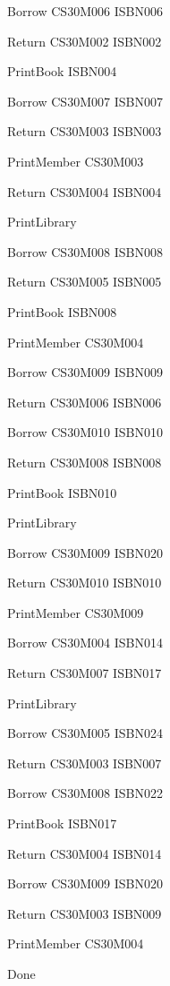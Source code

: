 Borrow
CS30M006 ISBN006

Return
CS30M002 ISBN002

PrintBook
ISBN004

Borrow
CS30M007 ISBN007

Return
CS30M003 ISBN003

PrintMember
CS30M003

Return
CS30M004 ISBN004

PrintLibrary

Borrow
CS30M008 ISBN008

Return
CS30M005 ISBN005

PrintBook
ISBN008

PrintMember
CS30M004

Borrow
CS30M009 ISBN009

Return
CS30M006 ISBN006

Borrow
CS30M010 ISBN010

Return
CS30M008 ISBN008

PrintBook
ISBN010

PrintLibrary

Borrow
CS30M009 ISBN020

Return
CS30M010 ISBN010

PrintMember
CS30M009

Borrow
CS30M004 ISBN014

Return
CS30M007 ISBN017

PrintLibrary

Borrow
CS30M005 ISBN024

Return
CS30M003 ISBN007

Borrow
CS30M008 ISBN022

PrintBook
ISBN017

Return
CS30M004 ISBN014

Borrow
CS30M009 ISBN020

Return
CS30M003 ISBN009

PrintMember
CS30M004

Done